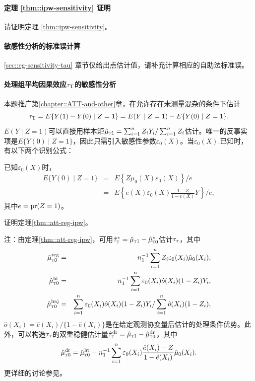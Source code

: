 \paragraph{定理 \ref{thm::ipw-sensitivity} 证明}\label{hw::proof-theorem-2-sa}

请证明定理 \ref{thm::ipw-sensitivity}。 


\paragraph{敏感性分析的标准误计算}\label{hw::sensitivity-se}

\ref{sec::eg-sensitivity-tau} 章节仅给出点估计值，请补充计算相应的自助法标准误。 

  


\paragraph{处理组平均因果效应$\tau_\textsc{T}$的敏感性分析}\label{hw::att-sentivity-analysis}

本题推广第\ref{chapter::ATT-and-other}章，在允许存在未测量混杂的条件下估计
$$
\tau_\textsc{T} = E\{  Y(1) - Y(0)  \mid Z=1  \} 
= E(Y\mid Z=1) - E\{  Y(0)  \mid Z=1  \} .
$$
$E(Y\mid Z=1)$可以直接用样本矩$\hat{\mu}_{\textsc{t}1} =   \sum_{i=1}^n Z_i Y_i / \sum_{i=1}^n Z_i$估计。唯一的反事实项是$E\{  Y(0)  \mid Z=1  \}$，因此只需引入敏感性参数$ \varepsilon_0(X) $。当$\varepsilon_0(X) .$已知时，有以下两个识别公式：

\begin{theorem}
\label{thm::att-reg-ipw}
已知$\varepsilon_0(X) $时，
\begin{eqnarray*}
E\{  Y(0)  \mid Z=1  \}  &=& E\left\{  Z \mu_0(X)  \varepsilon_0(X)    \right\} /e \\
&=& E\left\{  e(X)\varepsilon_0(X) \frac{ 1-Z}{1-e(X)}  Y      \right\} /e,
\end{eqnarray*}
其中$e = \textup{pr}(Z=1)$。
\end{theorem}


证明定理\ref{thm::att-reg-ipw}。 

注：由定理\ref{thm::att-reg-ipw}，可用$\hat{\tau}_{\textsc{t}}^* = \hat{\mu}_{\textsc{t}1}  - \hat{\mu}_{\textsc{t}0}^*$估计$\tau_{\textsc{t}}$，其中
\begin{eqnarray*}
\hat{\mu}_{\textsc{t}0}^\text{reg} &=& n_1^{-1} \sum_{i=1}^n Z_i  \varepsilon_0(X_i) \hat  \mu_0(X_i) ,   \\
\hat{\mu}_{\textsc{t}0}^\text{ht} &=& n_1^{-1} \sum_{i=1}^n   \varepsilon_0(X_i) \hat  o(X_i) (1-Z_i) Y_i ,   \\
\hat{\mu}_{\textsc{t}0}^\text{haj} &=&  \sum_{i=1}^n   \varepsilon_0(X_i) \hat  o(X_i) (1-Z_i) Y_i  /  \sum_{i=1}^n   \hat  o(X_i) (1-Z_i) , 
\end{eqnarray*}
$  \hat  o(X_i) = \hat  e(X_i) / \{1- \hat  e(X_i)\}$是在给定观测协变量后估计的处理条件优势。此外，可以构造$\tau_{\textsc{t}}$的双重稳健估计量$\hat{\tau}_{\textsc{t}}^\text{dr} = \hat{\mu}_{\textsc{t}1}  - \hat{\mu}_{\textsc{t}0}^\text{dr}$，其中
$$
\hat{\mu}_{\textsc{t}0}^\text{dr} = 
\hat{\mu}_{\textsc{t}0}^\text{ht}  - n_1^{-1} \sum_{i=1}^n \varepsilon_0(X_i) \frac{\hat e(X_i) - Z}{1-\hat e(X_i)}  \hat \mu_0(X_i)  . 
$$
更详细的讨论参见\citet{luding2023flexible}。 




